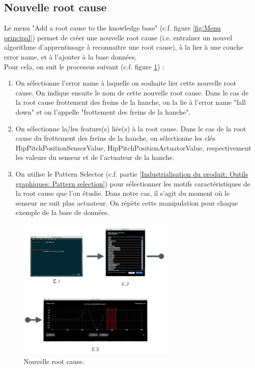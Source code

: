 \subsection{Nouvelle root cause}
\label{Industrialisation du produit: Utilisation suggérée des outils: Nouvelle root cause}
Le menu "Add a root cause to the knowledge base" (c.f. figure \ref{fig:Menu principal}) permet de créer une nouvelle root cause (i.e. entraîner un nouvel algorithme d'apprentissage à reconnaitre une root cause), à la lier à une couche error name, et à l'ajouter à la base données. \\
Pour cela, on suit le processus suivant (c.f. figure \ref{fig: Nouvelle root cause}) : 
\begin{enumerate}
	\item On sélectionne l'error name à laquelle on souhaite lier cette nouvelle root cause. On indique ensuite le nom de cette nouvelle root cause. Dans le cas de la root cause frottement des freins de la hanche, on la lie à l'error name "fall down" et on l'appelle "frottement des freins de la hanche". 
	\item On sélectionne la/les feature(s) liée(s) à la root cause. Dans le cas de la root cause du frottement des freins de la hanche, on sélectionne les clés HipPitchPositionSensorValue, HipPitchPositionActuatorValue, respectivement les valeurs du senseur et de l'actuateur de la hanche. 
	\item On utilise le Pattern Selector (c.f. partie \ref{Industrialisation du produit: Outils graphiques: Pattern selection}) pour sélectionner les motifs caractéristiques de la root cause que l'on étudie. Dans notre cas, il s'agit du moment où le senseur ne suit plus actuateur. On répète cette manipulation pour chaque exemple de la base de données.
\end{enumerate}

\begin{figure}[H]
	\centering\includegraphics[height=7cm]{images/add_root_menu.png}
	\caption[Nouvelle root cause]{Nouvelle root cause.}
	\label{fig: Nouvelle root cause}
\end{figure} 


